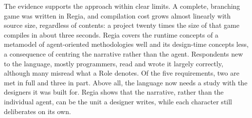 The evidence supports the approach within clear limits. A complete, branching game was written in Regia, and compilation cost grows almost linearly with source size, regardless of contents: a project twenty times the size of that game compiles in about three seconds. Regia covers the runtime concepts of a metamodel of agent-oriented methodologies well and its design-time concepts less, a consequence of centring the narrative rather than the agent. Respondents new to the language, mostly programmers, read and wrote it largely correctly, although many misread what a Role denotes. Of the five requirements, two are met in full and three in part. Above all, the language now needs a study with the designers it was built for. Regia shows that the narrative, rather than the individual agent, can be the unit a designer writes, while each character still deliberates on its own.

